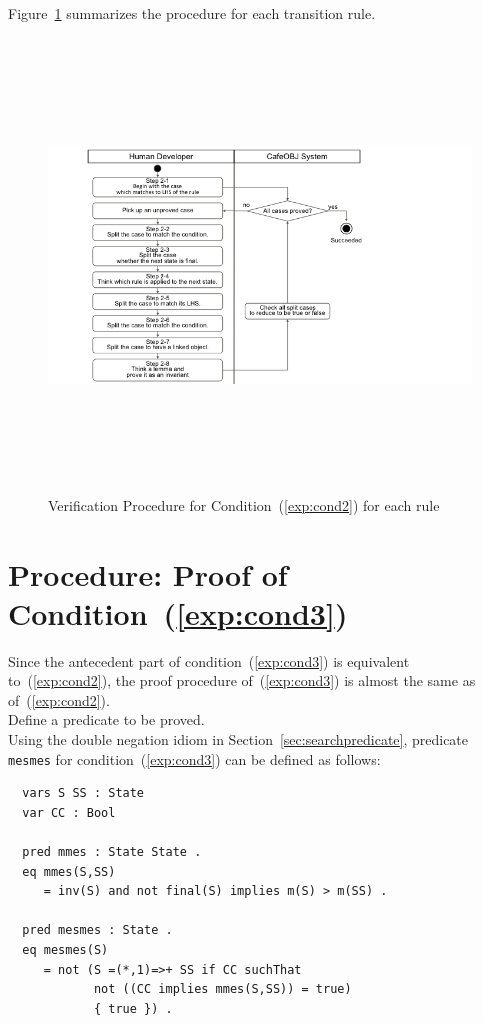 \documentclass[12pt]{report}
\begin{document}
Figure~\ref{fig:procedure2} summarizes the procedure for each transition rule.
\begin{figure}
\centering
\includegraphics[height=12cm,natwidth=720,natheight=405,clip,trim=60 0 180 0]{procedure2.png}
\caption{Verification Procedure for Condition~(\ref{exp:cond2}) for each rule}
\label{fig:procedure2}
\end{figure}

\section{Procedure: Proof of Condition~(\ref{exp:cond3})}
\label{sec:mesmes}
Since the antecedent part of condition~(\ref{exp:cond3}) is equivalent
to~(\ref{exp:cond2}), the proof procedure of~(\ref{exp:cond3}) is
almost the same as of~(\ref{exp:cond2}). \\

 Define a predicate to be proved.\\ Using the
double negation idiom in Section~\ref{sec:searchpredicate}, predicate
{\tt mesmes} for condition~(\ref{exp:cond3}) can be defined as follows:
\small
\begin{verbatim}
  vars S SS : State
  var CC : Bool

  pred mmes : State State .
  eq mmes(S,SS)
     = inv(S) and not final(S) implies m(S) > m(SS) .

  pred mesmes : State .
  eq mesmes(S)
     = not (S =(*,1)=>+ SS if CC suchThat
            not ((CC implies mmes(S,SS)) = true)
            { true }) .
\end{verbatim}
\normalsize
\end{document}
